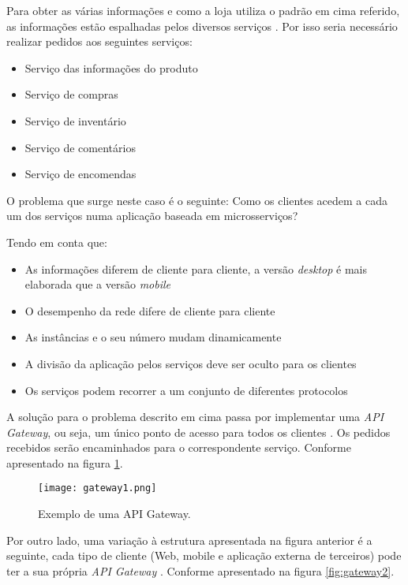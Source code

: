 Para obter as várias informações e como a loja utiliza o padrão em cima referido, as informações estão espalhadas pelos diversos serviços \cite{apiGatewayPattern}. Por isso seria necessário realizar pedidos aos seguintes serviços:

\begin{itemize}
    \item Serviço das informações do produto 
    \item Serviço de compras 
    \item Serviço de inventário  
    \item Serviço de comentários
    \item Serviço de encomendas 
\end{itemize}

O problema que surge neste caso é o seguinte: Como os clientes acedem a cada um dos serviços numa aplicação baseada em microsserviços? \cite{apiGatewayPattern}

Tendo em conta que:

\begin{itemize}
    \item As informações diferem de cliente para cliente, a versão \textit{desktop} é mais elaborada que a versão \textit{mobile} \cite{apiGatewayPattern}
    \item O desempenho da rede difere de cliente para cliente \cite{apiGatewayPattern}
    \item As instâncias e o seu número mudam dinamicamente  \cite{apiGatewayPattern}
    \item A divisão da aplicação  pelos serviços deve ser oculto para os clientes \cite{apiGatewayPattern}
    \item Os serviços podem recorrer a um conjunto de diferentes protocolos \cite{apiGatewayPattern}
\end{itemize}


A solução para o problema descrito em cima passa por implementar uma \textit{API Gateway}, ou seja, um único ponto de acesso para todos os clientes \cite{apiGatewayPattern}. Os pedidos recebidos serão encaminhados para o correspondente serviço. Conforme apresentado na figura \ref{fig:gateway1}.

\begin{figure}[H]
	\centering
	\texttt{[image: gateway1.png]}
	\caption{Exemplo de uma API Gateway.}
	\label{fig:gateway1}
\end{figure}

Por outro lado, uma variação à estrutura apresentada na figura anterior é a seguinte, cada tipo de cliente (Web, mobile e aplicação externa de terceiros) pode ter a sua própria \textit{API Gateway} \cite{apiGatewayPattern}. Conforme apresentado na figura \ref{fig:gateway2}.

